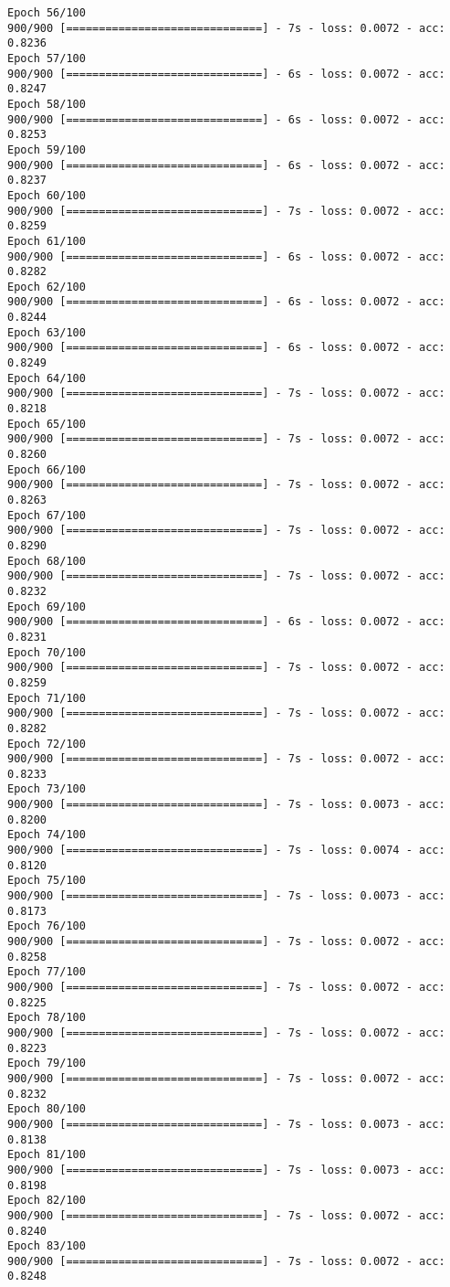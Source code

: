 \documentclass{article}
\begin{document}
\begin{Verbatim}[commandchars=\\\{\}]
Epoch 56/100
900/900 [==============================] - 7s - loss: 0.0072 - acc: 0.8236     
Epoch 57/100
900/900 [==============================] - 6s - loss: 0.0072 - acc: 0.8247     
Epoch 58/100
900/900 [==============================] - 6s - loss: 0.0072 - acc: 0.8253     
Epoch 59/100
900/900 [==============================] - 6s - loss: 0.0072 - acc: 0.8237     
Epoch 60/100
900/900 [==============================] - 7s - loss: 0.0072 - acc: 0.8259     
Epoch 61/100
900/900 [==============================] - 6s - loss: 0.0072 - acc: 0.8282     
Epoch 62/100
900/900 [==============================] - 6s - loss: 0.0072 - acc: 0.8244     
Epoch 63/100
900/900 [==============================] - 6s - loss: 0.0072 - acc: 0.8249     
Epoch 64/100
900/900 [==============================] - 7s - loss: 0.0072 - acc: 0.8218     
Epoch 65/100
900/900 [==============================] - 7s - loss: 0.0072 - acc: 0.8260     
Epoch 66/100
900/900 [==============================] - 7s - loss: 0.0072 - acc: 0.8263     
Epoch 67/100
900/900 [==============================] - 7s - loss: 0.0072 - acc: 0.8290     
Epoch 68/100
900/900 [==============================] - 7s - loss: 0.0072 - acc: 0.8232     
Epoch 69/100
900/900 [==============================] - 6s - loss: 0.0072 - acc: 0.8231     
Epoch 70/100
900/900 [==============================] - 7s - loss: 0.0072 - acc: 0.8259     
Epoch 71/100
900/900 [==============================] - 7s - loss: 0.0072 - acc: 0.8282     
Epoch 72/100
900/900 [==============================] - 7s - loss: 0.0072 - acc: 0.8233     
Epoch 73/100
900/900 [==============================] - 7s - loss: 0.0073 - acc: 0.8200     
Epoch 74/100
900/900 [==============================] - 7s - loss: 0.0074 - acc: 0.8120     
Epoch 75/100
900/900 [==============================] - 7s - loss: 0.0073 - acc: 0.8173     
Epoch 76/100
900/900 [==============================] - 7s - loss: 0.0072 - acc: 0.8258     
Epoch 77/100
900/900 [==============================] - 7s - loss: 0.0072 - acc: 0.8225     
Epoch 78/100
900/900 [==============================] - 7s - loss: 0.0072 - acc: 0.8223     
Epoch 79/100
900/900 [==============================] - 7s - loss: 0.0072 - acc: 0.8232     
Epoch 80/100
900/900 [==============================] - 7s - loss: 0.0073 - acc: 0.8138     
Epoch 81/100
900/900 [==============================] - 7s - loss: 0.0073 - acc: 0.8198     
Epoch 82/100
900/900 [==============================] - 7s - loss: 0.0072 - acc: 0.8240     
Epoch 83/100
900/900 [==============================] - 7s - loss: 0.0072 - acc: 0.8248     

\end{Verbatim}
\end{document}
